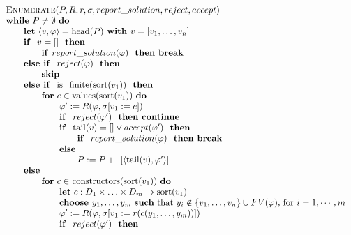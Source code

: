 \documentclass{article}
\newcommand{\concat}{\ensuremath{+\!\!+}}
\begin{document}
\[
\begin{tabular}{l}
\textsc{Enumerate}($P,R,r,\sigma, report\_solution, reject, accept)$ \\
\textbf{while} $P\neq \emptyset $ \textbf{do} \\
\qquad \textbf{let} $\left\langle v,\varphi \right\rangle =\mathrm{head}(P) 
\textbf{ with } v = [v_1, \ldots, v_n]$\\
\qquad \textbf{if } $v = []$ \textbf{ then} \\
\qquad \qquad \textbf{if }$report\_solution(\varphi)$ \textbf{ then break} \\
\qquad \textbf{else if } $reject(\varphi)$ \textbf{ then} \\
\qquad \qquad \textbf{skip} \\
\qquad \textbf{else if } $\mathrm{is\_finite}(\mathrm{sort}(v_{1}))$ \textbf{ then} \\
\qquad \qquad \textbf{for} $e\in \mathrm{values}(\mathrm{sort}(v_{1}))$ \textbf{do} \\
\qquad \qquad \qquad $\varphi^{\prime}:=R(\varphi,\sigma[v_{1}:=e])$ \\
\qquad \qquad \qquad \textbf{if } $reject(\varphi')$ \textbf{ then continue} \\
\qquad \qquad \qquad \textbf{if } $\mathrm{tail}(v) = [] \vee accept(\varphi')$ \textbf{ then} \\
\qquad \qquad \qquad \qquad \textbf{if } $report\_solution(\varphi)$ \textbf{ then break} \\
\qquad \qquad \qquad \textbf{else } \\ 
\qquad \qquad \qquad \qquad $P:=P\concat\lbrack \left\langle \mathrm{tail}(v), \varphi' \right\rangle ]$ \\
\qquad \textbf{else } \\
\qquad \qquad \textbf{for} $c\in $ $\mathrm{constructors}(\mathrm{sort}(v_{1}))$ \textbf{do} \\
\qquad \qquad \qquad \textbf{let} $c:D_{1}\times \ldots \times
D_{m}\rightarrow \mathrm{sort}(v_{1})$ \\
\qquad \qquad \qquad \textbf{choose }$y_1,\ldots ,y_m$
\textbf{such} that $y_i \notin \{ v_1, \ldots ,v_n \} \cup FV(\varphi)$, for $i=1, \cdots, m$ \\
\qquad \qquad \qquad $\varphi ^{\prime }:=R(\varphi ,\sigma \lbrack v_{1}:=r(c(y_{1},\ldots ,y_{m}))])$ \\
\qquad \qquad \qquad \textbf{if } $reject(\varphi')$ \textbf{ then} \\

\end{tabular}\]
\end{document}
